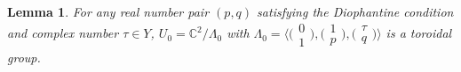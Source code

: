 \documentclass[pdftex]{sigma}
\numberwithin{equation}{section}
\newtheorem{Lemma}[Theorem]{Lemma}
\begin{document}
\begin{Lemma} \label{Lemma2.12}
For any real number pair $(p,q)$ satisfying the Diophantine condition and complex number $\tau \in Y$, $U_0=\mathbb{C}^2/\Lambda_0$ with $\Lambda_0=\bigl\langle\bigl(\begin{smallmatrix}0 \\1\end{smallmatrix}\bigr),\bigl(\begin{smallmatrix}1 \\p\end{smallmatrix}\bigr),\bigl(\begin{smallmatrix}\tau \\q\end{smallmatrix}\bigr)\bigr\rangle$ is a toroidal group.
\end{Lemma}
\end{document}

